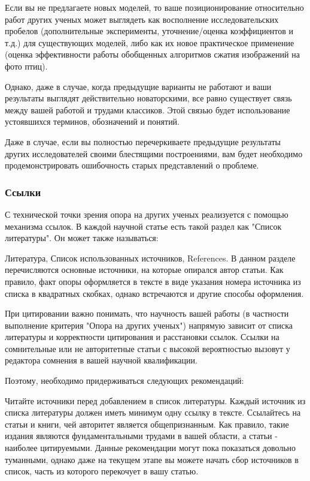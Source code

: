 \documentclass{report}
\begin{document}
Если вы не предлагаете новых моделей, то ваше позиционирование относительно работ других ученых может выглядеть как восполнение исследовательских пробелов (дополнительные эксперименты, уточнение/оценка коэффициентов и т.д.) для существующих моделей, либо как их новое практическое применение (оценка эффективности работы обобщенных алгоритмов сжатия изображений на фото птиц).

Однако, даже в случае, когда предыдущие варианты не работают и ваши результаты выглядят действительно новаторскими, все равно существует связь между вашей работой и трудами классиков. Этой связью будет использование устоявшихся терминов, обозначений и понятий.

Даже в случае, если вы полностью перечеркиваете предыдущие результаты других исследователей своими блестящими построениями, вам будет необходимо продемонстрировать ошибочность старых представлений о проблеме.

\subsubsection{Ссылки}
С технической точки зрения опора на других ученых реализуется  с помощью механизма ссылок. В каждой научной статье есть такой раздел как "Список литературы". Он может также называться:

Литература,
Список использованных источников,
References.
В данном разделе перечисляются основные источники, на которые опирался автор статьи. Как правило, факт опоры оформляется в тексте в виде указания номера источника из списка в квадратных скобках, однако встречаются и другие способы оформления.

При цитировании важно понимать, что научность вашей работы (в частности выполнение критерия "Опора на других ученых") напрямую зависит от списка литературы и корректности цитирования и расстановки ссылок. Ссылки на сомнительные или не авторитетные статьи с высокой вероятностью вызовут у редактора сомнения в вашей научной квалификации.

Поэтому, необходимо придерживаться следующих рекомендаций:

Читайте источники перед добавлением в список литературы.
Каждый источник из списка литературы должен иметь минимум одну ссылку в тексте.
Ссылайтесь на статьи и книги, чей авторитет является общепризнанным. Как правило, такие издания являются фундаментальными трудами в вашей области, а статьи - наиболее цитируемыми.
Данные рекомендации могут пока показаться довольно туманными, однако даже на текущем этапе вы можете начать сбор источников в список, часть из которого перекочует в вашу статью.
\end{document}
